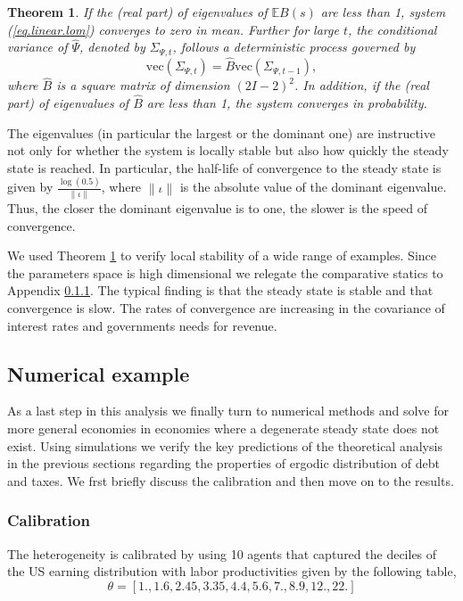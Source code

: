 \documentclass[11.5pt,twoside]{article}
\newtheorem{theorem}{Theorem}
\begin{document}
\begin{theorem}\label{thm: localstability}
If the (real part) of eigenvalues of $\mathbb{E}B(s)$ are less than 1,  system (\ref{eq.linear.lom}) converges to zero  in mean. Further for large $t$, the conditional variance of $\hat{\Psi}$, denoted by $\Sigma_{\Psi,t}$, follows a deterministic process governed by
\[\text{vec}(\Sigma_{\Psi,t})=\hat{B} \text{vec}(\Sigma_{\Psi,t-1}),\]	
where $\hat{B}$ is a square matrix of dimension $(2I-2)^2$. In addition,  if the (real part) of eigenvalues of $\hat{B}$ are less than 1, the system converges in probability.
\end{theorem}

The eigenvalues (in particular the largest or the dominant one) are instructive not only for whether the system is locally stable but also how quickly the steady state is reached. In particular, the half-life of convergence to the steady state is given by $\frac{\log(0.5)}{\|\iota\|}$, where $\|\iota\|$ is the absolute value of the dominant eigenvalue.  Thus, the closer the dominant eigenvalue is to one, the slower is the speed of convergence.

We used Theorem \ref{thm: localstability} to verify local stability of a wide range of examples. Since the parameters space is high dimensional we relegate the comparative statics to Appendix \ref{}. The typical finding is that the steady state is stable and that convergence is slow. The rates of convergence are increasing in the covariance of interest rates and governments needs for revenue. 


\subsection{Numerical example}

As a last step in this analysis we finally turn to numerical methods and solve for more general economies in economies where a degenerate steady state does not exist. Using simulations we verify the key predictions of the theoretical analysis in the previous sections regarding the properties of ergodic distribution of debt and taxes. We frst briefly discuss the calibration and then move on to the results.


\subsubsection{Calibration}
The heterogeneity is calibrated by using 10 agents that captured the deciles of the US earning distribution with labor productivities given by the following table,
\[
\theta =  [  1.  ,   1.6 ,   2.45,   3.35,   4.4 ,   5.6 ,   7.  ,   8.9 ,
        12.  ,  22.  ]
\]
\end{document}
